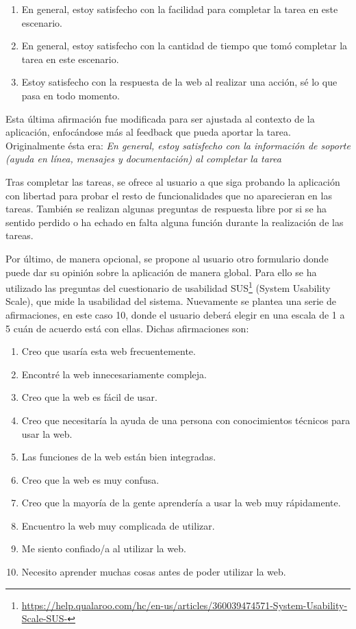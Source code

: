 \begin{enumerate}
	\item En general, estoy satisfecho con la facilidad para completar la tarea en este escenario.
	\item En general, estoy satisfecho con la cantidad de tiempo que tomó completar la tarea en este escenario.
	\item Estoy satisfecho con la respuesta de la web al realizar una acción, sé lo que pasa en todo momento.
\end{enumerate}

Esta última afirmación fue modificada para ser ajustada al contexto de la aplicación, enfocándose más al feedback que pueda aportar la tarea. Originalmente ésta era:  \textit{En general, estoy satisfecho con la información de soporte (ayuda en línea, mensajes y documentación) al completar la tarea}

Tras completar las tareas, se ofrece al usuario a que siga probando la aplicación con libertad para probar el resto de funcionalidades que no aparecieran en las tareas.  
También se realizan algunas preguntas de respuesta libre por si se ha sentido perdido o ha echado en falta alguna función durante la realización de las tareas. 

Por último, de manera opcional, se propone al usuario otro formulario donde puede dar su opinión sobre la aplicación de manera global. Para ello se ha utilizado las preguntas del cuestionario de usabilidad  SUS\footnote{\url{https://help.qualaroo.com/hc/en-us/articles/360039474571-System-Usability-Scale-SUS-}} (System Usability Scale), que mide la usabilidad del sistema. Nuevamente se plantea una serie de afirmaciones, en este caso 10, donde el usuario deberá elegir en una escala de 1 a 5 cuán de acuerdo está con ellas. Dichas afirmaciones son: 


\begin{enumerate}
	\item Creo que usaría esta web frecuentemente.
	\item Encontré la web innecesariamente compleja.
	\item Creo que la web es fácil de usar.
	\item Creo que necesitaría la ayuda de una persona con conocimientos técnicos para usar la web.
	\item Las funciones de la web están bien integradas.
	\item Creo que la web es muy confusa.
	\item Creo que la mayoría de la gente aprendería a usar la web muy rápidamente.
	\item Encuentro la web muy complicada de utilizar.
	\item Me siento confiado/a al utilizar la web.
	\item Necesito aprender muchas cosas antes de poder utilizar la web.
\end{enumerate}

